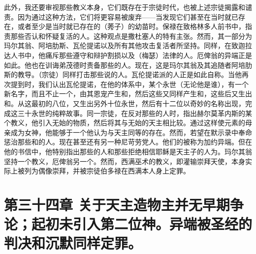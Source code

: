 此外，我还要审视那些教义本身，它们既存在于宗徒时代，也被上述宗徒揭露和谴责。因为通过这种方法，它们将更容易被废弃——当发现它们甚至在当时就已存在，或者至少是当时就已存在的（莠子）的幼苗时。保禄在致格林多人前书中，指责那些否认和怀疑复活的人。这种观点是撒杜塞人的特有主张。然而，其一部分为玛尔其翁、阿培肋斯、瓦伦提诺以及所有其他攻击复活者所坚持。同样，在致迦拉达人书中，他痛斥那些遵守和辩护割损以及（梅瑟）法律的人。厄俾翁的异端正是如此。他也在训诲弟茂德时责备那些的人。现在，这是玛尔其翁及其追随者阿培肋斯的教导。（宗徒）同样打击那些说的人。瓦伦提诺派的人正是如此自称。当他再次提到时，我们认出瓦伦提诺，在他的体系中，某个永世（无论他是谁），有一个新名字，而且不止一个，由其恩宠产生和，然后这些又同样产生和，这些后又生出和。从这最初的八位，又生出另外十位永世，然后有十二位以奇妙的名称出现，完成这三十永世的纯粹故事。同一宗徒，在反对那些的人时，指出赫尔莫革内斯的某个教义，他引入无始的物质，然后将其与无始的天主相比较。通过这样使元素的母亲成为女神，他能够于一个他认为与天主同等的存在。然而，若望在默示录中奉命惩治那些和的人。现在甚至还有另一种尼苛劳党人。他们的被称为加约异端。但在他的书信中，他特别指出那些的人和那些拒绝相信耶稣是天主子的人为。玛尔其翁坚持一个教义，厄俾翁另一个。然而，西满巫术的教义，即灌输崇拜天使，本身实际上被列为偶像崇拜，并被宗徒伯多禄在西满本人身上定罪。\par


\section{第三十四章 关于天主造物主并无早期争论；起初未引入第二位神。异端被圣经的判决和沉默同样定罪。}

